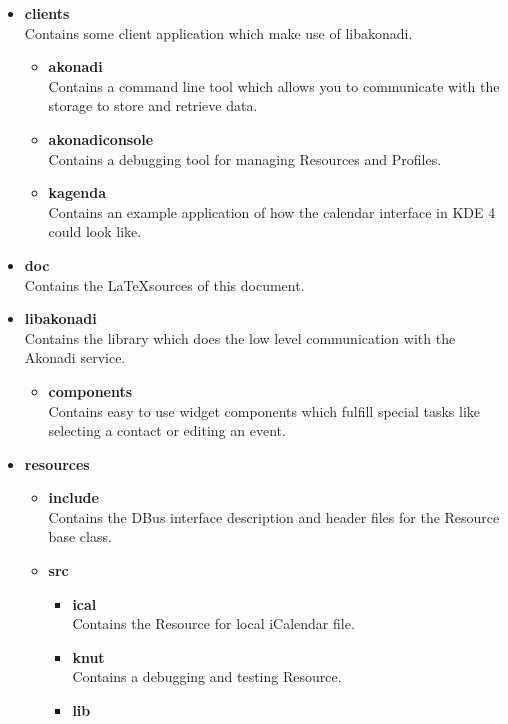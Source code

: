 \documentclass[]{report}
\begin{document}
\begin{itemize}
  \item \textbf{clients}\\
    Contains some client application which make use of libakonadi.
  \begin{itemize}
    \item \textbf{akonadi}\\
      Contains a command line tool which allows you to communicate with the
      storage to store and retrieve data.
    \item \textbf{akonadiconsole}\\
      Contains a debugging tool for managing Resources and Profiles.
    \item \textbf{kagenda}\\
      Contains an example application of how the calendar interface in KDE 4
      could look like.
  \end{itemize}
  \item \textbf{doc}\\
    Contains the \LaTeX sources of this document.
  \item \textbf{libakonadi}\\
    Contains the library which does the low level communication with the
    Akonadi service.
  \begin{itemize}
    \item \textbf{components}\\
      Contains easy to use widget components which fulfill special tasks like
      selecting a contact or editing an event.
  \end{itemize}
  \item \textbf{resources}\\
  \begin{itemize}
    \item \textbf{include}\\
      Contains the DBus interface description and header files for the Resource
      base class.
    \item \textbf{src}\\
    \begin{itemize}
      \item \textbf{ical}\\
        Contains the Resource for local iCalendar file.
      \item \textbf{knut}\\
        Contains a debugging and testing Resource.
      \item \textbf{lib}\\

\end{itemize}
\end{itemize}
\end{itemize}
\end{document}
